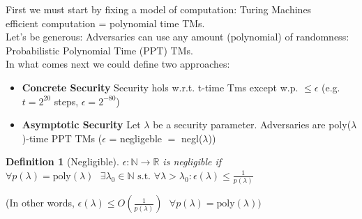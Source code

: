\documentclass[11pt, a4paper]{article}
\newcommand{\R}{\mathbb{R}}
\newcommand{\N}{\mathbb{N}}
\newtheorem{defn}{Definition}
\begin{document}
First we must start by fixing a model of computation: Turing Machines\\
efficient computation = polynomial time TMs.\\
Let's be generous: Adversaries can use any amount (polynomial) of randomness: Probabilistic Polynomial Time (PPT) TMs.\\
In what comes next we could define two approaches:
\begin{itemize}
    \item \textbf{Concrete Security} Security hols w.r.t. t-time Tms except w.p. $\leq \epsilon$ (e.g.  $t= 2^20$ steps, $\epsilon = 2^{-80}$)
    \item \textbf{Asymptotic Security} Let $\lambda$ be a security parameter. Adversaries are poly($\lambda$)-time PPT TMs ($\epsilon$ = negligeble $=$ negl($\lambda$))\\
\end{itemize}
\begin{defn}[Negligible]
    $\epsilon: \N \rightarrow \R$ is negligible if $\forall p(\lambda)=\text{poly}(\lambda) \text{ } \exists \lambda_0 \in \N \text{ s.t. } \forall \lambda > \lambda_0: \epsilon(\lambda) \leq \frac{1}{p(\lambda)}$
\end{defn}
(In other words, $\epsilon(\lambda) \leq O(\frac{1}{p(\lambda)}) \text{  }\forall p(\lambda) = \text{poly}(\lambda))$\\
\end{document}
